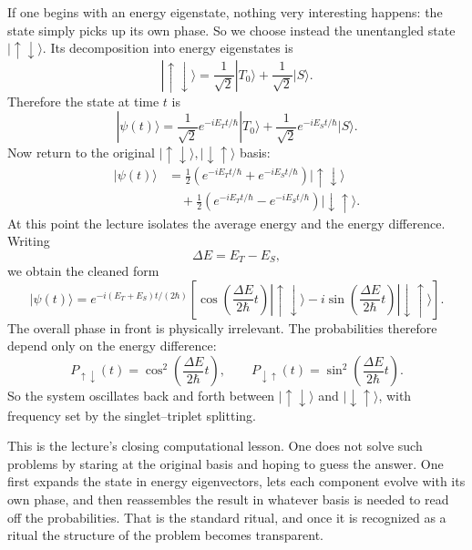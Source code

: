 If one begins with an energy eigenstate, nothing very interesting happens: the state simply picks up its own phase. So we choose instead the unentangled state \(|\uparrow\downarrow\rangle\). Its decomposition into energy eigenstates is
\begin{equation}
|\uparrow\downarrow\rangle
=
\frac{1}{\sqrt2}|T_0\rangle
+
\frac{1}{\sqrt2}|S\rangle.
\end{equation}
Therefore the state at time \(t\) is
\begin{equation}
|\psi(t)\rangle
=
\frac{1}{\sqrt2}e^{-iE_T t/\hbar}|T_0\rangle
+
\frac{1}{\sqrt2}e^{-iE_S t/\hbar}|S\rangle.
\end{equation}
Now return to the original \(|\uparrow\downarrow\rangle,|\downarrow\uparrow\rangle\) basis:
\begin{align}
|\psi(t)\rangle
&=
\frac12\left(e^{-iE_T t/\hbar}+e^{-iE_S t/\hbar}\right)|\uparrow\downarrow\rangle \\
&\quad
+
\frac12\left(e^{-iE_T t/\hbar}-e^{-iE_S t/\hbar}\right)|\downarrow\uparrow\rangle.
\end{align}
At this point the lecture isolates the average energy and the energy difference. Writing
\begin{equation}
\Delta E = E_T-E_S,
\end{equation}
we obtain the cleaned form
\begin{equation}
|\psi(t)\rangle
=
e^{-i(E_T+E_S)t/(2\hbar)}
\left[
\cos\!\left(\frac{\Delta E}{2\hbar}t\right)|\uparrow\downarrow\rangle
-
i\sin\!\left(\frac{\Delta E}{2\hbar}t\right)|\downarrow\uparrow\rangle
\right].
\end{equation}
The overall phase in front is physically irrelevant. The probabilities therefore depend only on the energy difference:
\begin{equation}
P_{\uparrow\downarrow}(t)
=
\cos^2\!\left(\frac{\Delta E}{2\hbar}t\right),
\qquad
P_{\downarrow\uparrow}(t)
=
\sin^2\!\left(\frac{\Delta E}{2\hbar}t\right).
\end{equation}
So the system oscillates back and forth between \(|\uparrow\downarrow\rangle\) and \(|\downarrow\uparrow\rangle\), with frequency set by the singlet--triplet splitting.

This is the lecture's closing computational lesson. One does not solve such problems by staring at the original basis and hoping to guess the answer. One first expands the state in energy eigenvectors, lets each component evolve with its own phase, and then reassembles the result in whatever basis is needed to read off the probabilities. That is the standard ritual, and once it is recognized as a ritual the structure of the problem becomes transparent.

